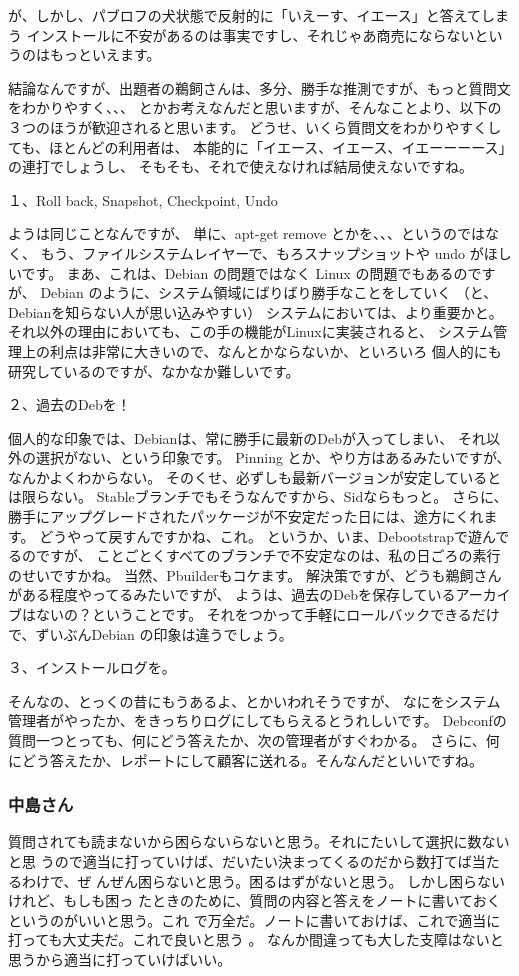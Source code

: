 \documentclass[mingoth,a4paper]{jsarticle}
\begin{document}
が、しかし、パブロフの犬状態で反射的に「いえーす、イエース」と答えてしまう
インストールに不安があるのは事実ですし、それじゃあ商売にならないというのはもっといえます。

結論なんですが、出題者の鵜飼さんは、多分、勝手な推測ですが、もっと質問文をわかりやすく、、、
とかお考えなんだと思いますが、そんなことより、以下の３つのほうが歓迎されると思います。
どうせ、いくら質問文をわかりやすくしても、ほとんどの利用者は、
本能的に「イエース、イエース、イエーーーース」の連打でしょうし、
そもそも、それで使えなければ結局使えないですね。

１、Roll back, Snapshot, Checkpoint, Undo

ようは同じことなんですが、
単に、apt-get remove とかを、、、というのではなく、
もう、ファイルシステムレイヤーで、もろスナップショットや undo がほしいです。
まあ、これは、Debian の問題ではなく Linux の問題でもあるのですが、
Debian のように、システム領域にばりばり勝手なことをしていく
（と、Debianを知らない人が思い込みやすい）
システムにおいては、より重要かと。
それ以外の理由においても、この手の機能がLinuxに実装されると、
システム管理上の利点は非常に大きいので、なんとかならないか、といろいろ
個人的にも研究しているのですが、なかなか難しいです。

２、過去のDebを！

個人的な印象では、Debianは、常に勝手に最新のDebが入ってしまい、
それ以外の選択がない、という印象です。
Pinning とか、やり方はあるみたいですが、なんかよくわからない。
そのくせ、必ずしも最新バージョンが安定しているとは限らない。
Stableブランチでもそうなんですから、Sidならもっと。
さらに、勝手にアップグレードされたパッケージが不安定だった日には、途方にくれます。
どうやって戻すんですかね、これ。
というか、いま、Debootstrapで遊んでるのですが、
ことごとくすべてのブランチで不安定なのは、私の日ごろの素行のせいですかね。
当然、Pbuilderもコケます。
解決策ですが、どうも鵜飼さんがある程度やってるみたいですが、
ようは、過去のDebを保存しているアーカイブはないの？ということです。
それをつかって手軽にロールバックできるだけで、ずいぶんDebian の印象は違うでしょう。

３、インストールログを。

そんなの、とっくの昔にもうあるよ、とかいわれそうですが、
なにをシステム管理者がやったか、をきっちりログにしてもらえるとうれしいです。
Debconfの質問一つとっても、何にどう答えたか、次の管理者がすぐわかる。
さらに、何にどう答えたか、レポートにして顧客に送れる。そんなんだといいですね。

\subsubsection{中島さん} 
質問されても読まないから困らないらないと思う。それにたいして選択に数ないと思
うので適当に打っていけば、だいたい決まってくるのだから数打てば当たるわけで、ぜ
んぜん困らないと思う。困るはずがないと思う。 しかし困らないけれど、もしも困っ
たときのために、質問の内容と答えをノートに書いておくというのがいいと思う。これ
で万全だ。ノートに書いておけば、これで適当に打っても大丈夫だ。これで良いと思う
。 なんか間違っても大した支障はないと思うから適当に打っていけばいい。
\end{document}
